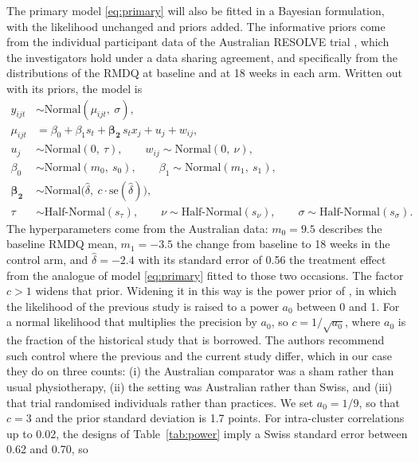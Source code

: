 \documentclass[11pt,a4paper]{article}
\begin{document}
The primary model \eqref{eq:primary} will also be fitted in a Bayesian
formulation, with the likelihood unchanged and priors added. The informative priors come from the
individual participant data of the Australian RESOLVE trial
\citep{bagg2022}, which the investigators hold under a data sharing agreement, and specifically from the distributions
of the RMDQ at baseline and at 18 weeks in each arm. Written out with its priors, the model is
\begin{align}
\label{eq:bayes}
y_{ijt} &\sim \mathrm{Normal}(\mu_{ijt},\ \sigma), \nonumber\\
\mu_{ijt} &= \beta_0 + \beta_1 s_t + \boldsymbol{\beta_2}\, s_t x_j + u_j + w_{ij},
  \nonumber\\
u_j &\sim \mathrm{Normal}(0,\ \tau), \qquad
  w_{ij} \sim \mathrm{Normal}(0,\ \nu), \nonumber\\
\beta_0 &\sim \mathrm{Normal}(m_0,\ s_0), \qquad
  \beta_1 \sim \mathrm{Normal}(m_1,\ s_1), \\
\boldsymbol{\beta_2} &\sim \mathrm{Normal}\bigl(\hat\delta,\ c \cdot \mathrm{se}(\hat\delta)\bigr),
  \nonumber\\
\tau &\sim \mathrm{Half\text{-}Normal}(s_\tau), \qquad
  \nu \sim \mathrm{Half\text{-}Normal}(s_\nu), \qquad
  \sigma \sim \mathrm{Half\text{-}Normal}(s_\sigma). \nonumber
\end{align}
The hyperparameters come from the Australian data: $m_0 = 9.5$ describes
the baseline RMDQ mean, $m_1 = -3.5$ the change from baseline to 18 weeks in
the control arm, and $\hat\delta = -2.4$ with its standard error of 0.56
the treatment effect from the analogue of model \eqref{eq:primary} fitted
to those two occasions. The factor $c > 1$ widens that prior. Widening
it in this way is the power prior of \citet{ibrahim2000}, in which the
likelihood of the previous study is raised to a power $a_0$ between 0 and 1.
For a normal likelihood that multiplies the precision by $a_0$, so
$c = 1 / \sqrt{a_0}$, where $a_0$ is the fraction of the historical study
that is borrowed.
The authors recommend such control where the previous and the current study differ,
which in our case they do on three counts: (i) the Australian comparator was a sham
rather than usual physiotherapy, (ii) the setting was Australian rather than
Swiss, and (iii) that trial randomised individuals rather than practices. We set
$a_0 = 1/9$, so that $c = 3$ and the prior standard deviation is 1.7 points.
For intra-cluster correlations up to 0.02, the designs of
Table~\ref{tab:power} imply a Swiss standard error between 0.62 and 0.70, so
\end{document}
